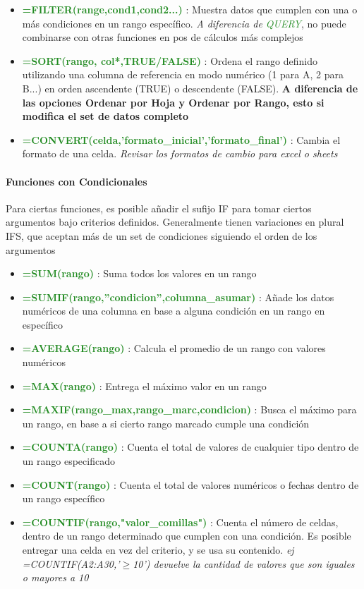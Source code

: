 \begin{itemize}
    \item {\textcolor{ForestGreen}{\textbf{=FILTER(range,cond1,cond2...)}} : Muestra datos que cumplen con una o más condiciones en un rango específico. \textit{A diferencia de \textcolor{ForestGreen}{QUERY}}, no puede combinarse con otras funciones en pos de cálculos más complejos}
    \item {\textcolor{ForestGreen}{\textbf{=SORT(rango, col*,TRUE/FALSE)}} : Ordena el rango definido utilizando una columna de referencia en modo numérico (1 para A, 2 para B...) en orden ascendente (TRUE) o descendente (FALSE). \textbf{A diferencia de las opciones Ordenar por Hoja y Ordenar por Rango, esto si modifica el set de datos completo}}
    \item {\textcolor{ForestGreen}{\textbf{=CONVERT(celda,'formato\_inicial','formato\_final')}} : Cambia el formato de una celda. \textit{Revisar los formatos de cambio para excel o sheets}}
\end{itemize}

\paragraph{Funciones con Condicionales}
Para ciertas funciones, es posible añadir el sufijo IF para tomar ciertos argumentos bajo criterios definidos. Generalmente tienen variaciones en plural IFS, que aceptan más de un set de condiciones siguiendo el orden de los argumentos
\begin{itemize}
    \item{\textcolor{ForestGreen}{\textbf{=SUM(rango)}} : Suma todos los valores en un rango}
    \item {\textcolor{ForestGreen}{\textbf{=SUMIF(rango,''condicion'',columna\_asumar)}} : Añade los datos numéricos de una columna en base a alguna condición en un rango en específico}
    \item {\textcolor{ForestGreen}{\textbf{=AVERAGE(rango)}} : Calcula el promedio de un rango con valores numéricos}
    \item {\textcolor{ForestGreen}{\textbf{=MAX(rango)}} : Entrega el máximo valor en un rango}
    \item {\textcolor{ForestGreen}{\textbf{=MAXIF(rango\_max,rango\_marc,condicion)}} : Busca el máximo para un rango, en base a si cierto rango marcado cumple una condición}
    \item {\textcolor{ForestGreen}{\textbf{=COUNTA(rango)}} : Cuenta el total de valores de cualquier tipo dentro de un rango especificado}
    \item {\textcolor{ForestGreen}{\textbf{=COUNT(rango)}} : Cuenta el total de valores numéricos o fechas dentro de un rango específico}
    \item {\textcolor{ForestGreen}{\textbf{=COUNTIF(rango,"valor\_comillas")}} : Cuenta el número de celdas, dentro de un rango determinado que cumplen con una condición. Es posible entregar una celda en vez del criterio, y se usa su contenido. \textit{ej =COUNTIF(A2:A30,'${\geq}$10') devuelve la cantidad de valores que son iguales o mayores a 10}}
    
    
\end{itemize}

